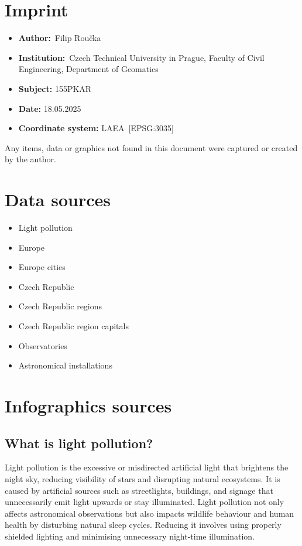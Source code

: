\documentclass{article}
\begin{document}
\section{Imprint}
\begin{itemize}
    \item \textbf{Author:}~Filip Roučka
    \item \textbf{Institution:}~Czech Technical University in Prague, Faculty of Civil Engineering, Department of Geomatics
    \item \textbf{Subject:} 155PKAR
    \item \textbf{Date:} 18.05.2025
    \item \textbf{Coordinate system:} LAEA~[EPSG:3035]
\end{itemize}
Any items, data or graphics not found in this document were captured or created by the author.

\section{Data sources}
\begin{itemize}
    \item Light pollution \cite{eog_vnl_annual_v2}
    \item Europe \cite{eurostat_gisco_countries}
    \item Europe cities \cite{eurostat_urban_audit}
    \item Czech Republic \cite{arcgis_online_dataset}
    \item Czech Republic regions \cite{arcgis_online_dataset}
    \item Czech Republic region capitals \cite{arcgis_online_dataset}
    \item Observatories  \cite{wiki_astronomical_observatories}
    \item Astronomical installations \cite{rise_hvezd_mapotic}
\end{itemize}

\section{Infographics sources}
\subsection*{What is light pollution?}

Light pollution is the excessive or misdirected artificial light that brightens the night sky, reducing visibility of stars and disrupting natural ecosystems. It is caused by artificial sources such as streetlights, buildings, and signage that unnecessarily emit light upwards or stay illuminated. Light pollution not only affects astronomical observations but also impacts wildlife behaviour and human health by disturbing natural sleep cycles. Reducing it involves using properly shielded lighting and minimising unnecessary night-time illumination\cite{wiki_light_pollution}\cite{IDA_light_pollution}.
\end{document}
